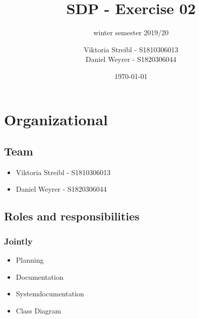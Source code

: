 

\graphicspath{{./}}



\title{SDP - Exercise 02} %
\subtitle{winter semester 2019/20} %
\author{
Viktoria Streibl - S1810306013\\
  Daniel Weyrer - S1820306044
} %
\date{\today} %

\maketitle %

\newpage
\tableofcontents %
\newpage


\section{Organizational}
\subsection{Team}
\begin{itemize}
	\item Viktoria 	Streibl 		- 	S1810306013
	\item Daniel 	Weyrer		-	S1820306044
\end{itemize}

\subsection{Roles and responsibilities}

\subsubsection{Jointly}
\begin{itemize}
	\item Planning
	\item Documentation
	\item Systemdocumentation
	\item Class Diagram
\end{itemize}

